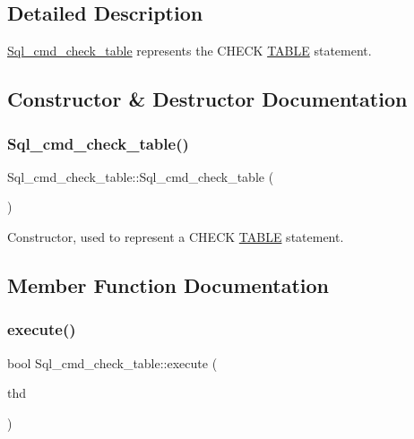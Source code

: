 \subsection{Detailed Description}
\mbox{\hyperlink{classSql__cmd__check__table}{Sql\+\_\+cmd\+\_\+check\+\_\+table}} represents the C\+H\+E\+CK \mbox{\hyperlink{structTABLE}{T\+A\+B\+LE}} statement. 

\subsection{Constructor \& Destructor Documentation}
\mbox{\label{classSql__cmd__check__table_aa9c39b9de353b9dc2a4edce4ec044fb3}} 
\subsubsection{\texorpdfstring{Sql\+\_\+cmd\+\_\+check\+\_\+table()}{Sql\_cmd\_check\_table()}}
{\footnotesize\ttfamily Sql\+\_\+cmd\+\_\+check\+\_\+table\+::\+Sql\+\_\+cmd\+\_\+check\+\_\+table (\begin{DoxyParamCaption}{ }\end{DoxyParamCaption})\hspace{0.3cm}{\ttfamily [inline]}}

Constructor, used to represent a C\+H\+E\+CK \mbox{\hyperlink{structTABLE}{T\+A\+B\+LE}} statement. 

\subsection{Member Function Documentation}
\mbox{\label{classSql__cmd__check__table_a05c38a51158692165f18f7c16199c468}} 
\subsubsection{\texorpdfstring{execute()}{execute()}}
{\footnotesize\ttfamily bool Sql\+\_\+cmd\+\_\+check\+\_\+table\+::execute (\begin{DoxyParamCaption}\item[{T\+HD $\ast$}]{thd }\end{DoxyParamCaption})\hspace{0.3cm}{\ttfamily [virtual]}}

